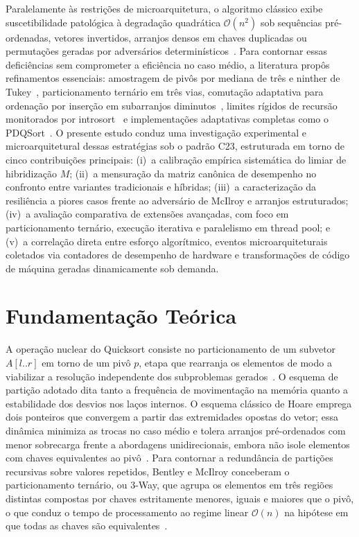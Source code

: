\documentclass[12pt]{article}
\begin{document}
Paralelamente às restrições de microarquitetura, o algoritmo clássico exibe suscetibilidade patológica à degradação quadrática $\mathcal{O}(n^2)$ sob sequências pré-ordenadas, vetores invertidos, arranjos densos em chaves duplicadas ou permutações geradas por adversários determinísticos~\cite{McIlroy1999}. Para contornar essas deficiências sem comprometer a eficiência no caso médio, a literatura propôs refinamentos essenciais: amostragem de pivôs por mediana de três e ninther de Tukey~\cite{BentleyMcIlroy1993}, particionamento ternário em três vias, comutação adaptativa para ordenação por inserção em subarranjos diminutos~\cite{Sedgewick1978}, limites rígidos de recursão monitorados por introsort~\cite{Musser1997} e implementações adaptativas completas como o PDQSort~\cite{Peters2021}. O presente estudo conduz uma investigação experimental e microarquitetural dessas estratégias sob o padrão C23, estruturada em torno de cinco contribuições principais: (i)~a calibração empírica sistemática do limiar de hibridização $M$; (ii)~a mensuração da matriz canônica de desempenho no confronto entre variantes tradicionais e híbridas; (iii)~a caracterização da resiliência a piores casos frente ao adversário de McIlroy e arranjos estruturados; (iv)~a avaliação comparativa de extensões avançadas, com foco em particionamento ternário, execução iterativa e paralelismo em thread pool; e (v)~a correlação direta entre esforço algorítmico, eventos microarquiteturais coletados via contadores de desempenho de hardware e transformações de código de máquina geradas dinamicamente sob demanda.

\section{Fundamentação Teórica}\label{sec:teoria}

A operação nuclear do Quicksort consiste no particionamento de um subvetor $A[l..r]$ em torno de um pivô $p$, etapa que rearranja os elementos de modo a viabilizar a resolução independente dos subproblemas gerados~\cite{Cormen2022}. O esquema de partição adotado dita tanto a frequência de movimentação na memória quanto a estabilidade dos desvios nos laços internos. O esquema clássico de Hoare emprega dois ponteiros que convergem a partir das extremidades opostas do vetor; essa dinâmica minimiza as trocas no caso médio e tolera arranjos pré-ordenados com menor sobrecarga frente a abordagens unidirecionais, embora não isole elementos com chaves equivalentes ao pivô~\cite{Hoare1961,Hoare1962}. Para contornar a redundância de partições recursivas sobre valores repetidos, Bentley e McIlroy conceberam o particionamento ternário, ou 3-Way, que agrupa os elementos em três regiões distintas compostas por chaves estritamente menores, iguais e maiores que o pivô, o que conduz o tempo de processamento ao regime linear $\mathcal{O}(n)$ na hipótese em que todas as chaves são equivalentes~\cite{BentleyMcIlroy1993}.
\end{document}
